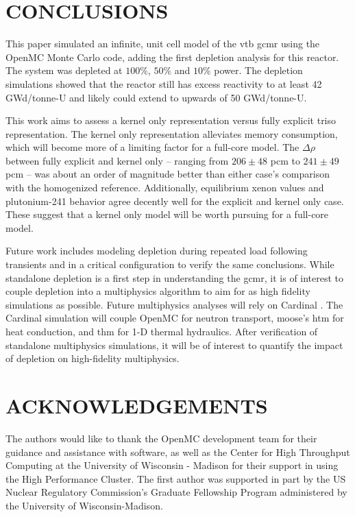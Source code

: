 \documentclass[letterpaper]{physor2024}
\begin{document}
\section{CONCLUSIONS}\label{sec:conclusions}
This paper simulated an infinite, unit cell model of the \gls{vtb} \gls{gcmr} using the OpenMC Monte Carlo code, adding the first depletion analysis for this reactor. The system was depleted at $100\%$, $50\%$ and $10\%$ power. The depletion simulations showed that the reactor still has excess reactivity to at least 42 GWd/tonne-U and likely could extend to upwards of 50 GWd/tonne-U.

This work aims to assess a kernel only representation versus fully explicit \gls{triso} representation. The kernel only representation alleviates memory consumption, which will become more of a limiting factor for a full-core model. The $\Delta \rho$ between fully explicit and kernel only -- ranging from $206\pm48$ \gls{pcm} to $241\pm49$ \gls{pcm} -- was about an order of magnitude better than either case's comparison with the homogenized reference. Additionally, equilibrium xenon values and plutonium-241 behavior agree decently well for the explicit and kernel only case. These suggest that a kernel only model will be worth pursuing for a full-core model.

Future work includes modeling depletion during repeated load following transients and in a critical configuration to verify the same conclusions. While standalone depletion is a first step in understanding the \gls{gcmr}, it is of interest to couple depletion into a multiphysics algorithm to aim for as high fidelity simulations as possible. Future multiphysics analyses will rely on Cardinal \cite{novak2022-cardinal}. The Cardinal simulation will couple OpenMC for neutron transport, \gls{moose}'s \gls{htm} for heat conduction, and \gls{thm} for 1-D thermal hydraulics. After verification of standalone multiphysics simulations, it will be of interest to quantify the impact of depletion on high-fidelity multiphysics.

\section*{ACKNOWLEDGEMENTS}
The authors would like to thank the OpenMC development team for their guidance and assistance with software, as well as the Center for High Throughput Computing at the University of Wisconsin - Madison for their support in using the High Performance Cluster. The first author was supported in part by the US Nuclear Regulatory Commission's Graduate Fellowship Program administered by the University of Wisconsin-Madison.




\end{document}
